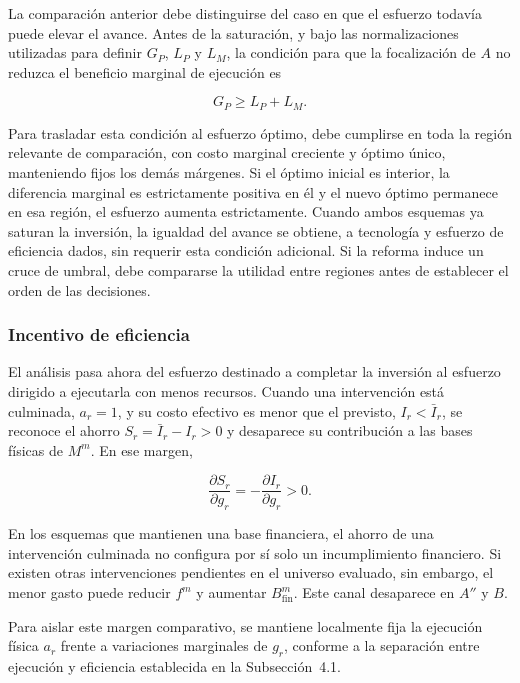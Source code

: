 La comparación anterior debe distinguirse del caso en que el esfuerzo todavía puede elevar el avance. Antes de la saturación, y bajo las normalizaciones utilizadas para definir \(G_P\), \(L_P\) y \(L_M\), la condición para que la focalización de \(A\) no reduzca el beneficio marginal de ejecución es

\begin{equation}
\label{eq:condicion_focalizacion_a_a0}
G_P
\geq
L_P+L_M.
\end{equation}

Para trasladar esta condición al esfuerzo óptimo, debe cumplirse en toda la región relevante de comparación, con costo marginal creciente y óptimo único, manteniendo fijos los demás márgenes. Si el óptimo inicial es interior, la diferencia marginal es estrictamente positiva en él y el nuevo óptimo permanece en esa región, el esfuerzo aumenta estrictamente. Cuando ambos esquemas ya saturan la inversión, la igualdad del avance se obtiene, a tecnología y esfuerzo de eficiencia dados, sin requerir esta condición adicional. Si la reforma induce un cruce de umbral, debe compararse la utilidad entre regiones antes de establecer el orden de las decisiones.

\subsubsection{Incentivo de eficiencia}

El análisis pasa ahora del esfuerzo destinado a completar la inversión al esfuerzo dirigido a ejecutarla con menos recursos. Cuando una intervención está culminada, \(a_r=1\), y su costo efectivo es menor que el previsto, \(I_r<\bar I_r\), se reconoce el ahorro \(S_r=\bar I_r-I_r>0\) y desaparece su contribución a las bases físicas de \(M^m\). En ese margen,

\begin{equation}
\label{eq:derivada_ahorro_eficiencia}
\frac{\partial S_r}{\partial g_r}
=
-
\frac{\partial I_r}{\partial g_r}
>
0.
\end{equation}

En los esquemas que mantienen una base financiera, el ahorro de una intervención culminada no configura por sí solo un incumplimiento financiero. Si existen otras intervenciones pendientes en el universo evaluado, sin embargo, el menor gasto puede reducir \(f^m\) y aumentar \(B_{\mathrm{fin}}^m\). Este canal desaparece en \(A''\) y \(B\).

Para aislar este margen comparativo, se mantiene localmente fija la ejecución física \(a_r\) frente a variaciones marginales de \(g_r\), conforme a la separación entre ejecución y eficiencia establecida en la Subsección~4.1.

